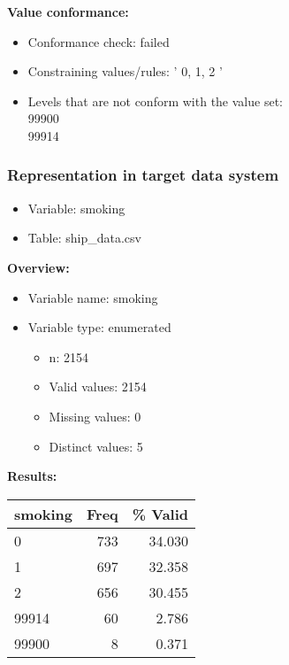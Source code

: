 \documentclass[
]{article}
\providecommand{\tightlist}{%
  \setlength{\itemsep}{0pt}\setlength{\parskip}{0pt}}
\begin{document}
\textbf{Value conformance:}

\begin{itemize}
\tightlist
\item
  Conformance check: failed
\item
  Constraining values/rules: ' 0, 1, 2 '
\item
  Levels that are not conform with the value set:\\
  99900\\
  99914
\end{itemize}

\newpage

\hypertarget{representation-in-target-data-system-25}{%
\subsubsection{\texorpdfstring{Representation in \textbf{target} data
system}{Representation in target data system}}\label{representation-in-target-data-system-25}}

\begin{itemize}
\tightlist
\item
  Variable: smoking
\item
  Table: ship\_data.csv
\end{itemize}

\textbf{Overview:}

\begin{itemize}
\tightlist
\item
  Variable name: smoking
\item
  Variable type: enumerated

  \begin{itemize}
  \tightlist
  \item
    n: 2154
  \item
    Valid values: 2154
  \item
    Missing values: 0
  \item
    Distinct values: 5
  \end{itemize}
\end{itemize}

\textbf{Results:}\\

\begin{table}[H]
\centering
\begin{tabular}{l|r|r}
\hline
\textbf{smoking} & \textbf{Freq} & \textbf{\% Valid}\\
\hline
0 & 733 & 34.030\\
\hline
1 & 697 & 32.358\\
\hline
2 & 656 & 30.455\\
\hline
99914 & 60 & 2.786\\
\hline
99900 & 8 & 0.371\\
\hline
\end{tabular}
\end{table}
\end{document}
